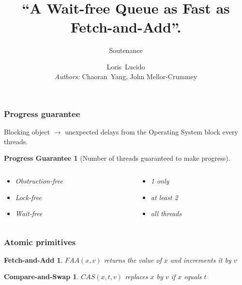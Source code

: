 \documentclass[10pt,a4paper]{beamer}
\title{``A Wait-free Queue as Fast as Fetch-and-Add''.}
\subtitle{Soutenance}
\author[L. Lucido]{Loris~Lucido\\\small{\textit{Authors:} Chaoran~Yang,
        John Mellor-Crummey}\\[-.25em]}
\institute[IR]{Lecture d'articles}
\date{\displaydate{date}}
\begin{document}
\begin{frame}
  \vspace{3.5em}
  \titlepage
\end{frame}


\begin{frame}
  \frametitle{Progress guarantee}
  Blocking object $\rightarrow$ unexpected delays from the Operating System
  block every threads. \center \vfill
  \newtheorem{progress}[theorem]{Progress Guarantee}
  \begin{progress}[Number of threads guaranteed to make progress]
    \begin{columns}
      \begin{column}{0.5\textwidth}
        \begin{itemize}
        \item Obstruction-free
        \item Lock-free
        \item Wait-free
        \end{itemize}
      \end{column}
      \begin{column}{0.5\textwidth}
        \begin{itemize}
        \item[] 1 only
        \item[] at least 2
        \item[] all threads
        \end{itemize}
      \end{column}
    \end{columns}
  \end{progress}
\end{frame}

\begin{frame}
  \frametitle{Atomic primitives}
  \newtheorem{faa}[theorem]{Fetch-and-Add}
  \newtheorem{cas}[theorem]{Compare-and-Swap}
  \begin{faa}
    $FAA(x, v)$ returns the value of $x$ and increments it by $v$
  \end{faa}
  \vfill
  \begin{cas}
    $CAS(x,t,v)$ replaces $x$ by $v$ if $x$ equals $t$
  \end{cas}
\end{frame}
\end{document}
